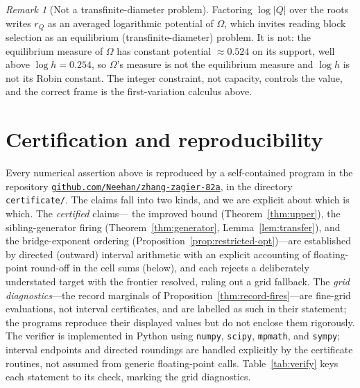 \documentclass[11pt,reqno]{amsart}
\theoremstyle{plain}
\theoremstyle{definition}
\theoremstyle{remark}
\newtheorem{remark}[theorem]{Remark}
\newcommand{\rQ}{r_Q}
\newcommand{\repo}{\href{https://github.com/Neehan/zhang-zagier-82a}{\texttt{github.com/Neehan/zhang-zagier-82a}}}
\begin{document}
\begin{remark}[Not a transfinite-diameter problem]\label{rem:noteq}
Factoring $\log|Q|$ over the roots writes $\rQ$ as an averaged logarithmic potential
of $\Omega$, which invites reading block selection as an equilibrium
(transfinite-diameter) problem. It is not: the equilibrium measure of $\Omega$ has
constant potential $\approx0.524$ on its support, well above $\log h=0.254$, so
$\Omega$'s measure is not the equilibrium measure and $\log h$ is not its Robin
constant. The integer constraint, not capacity, controls the value, and the correct
frame is the first-variation calculus above.
\end{remark}

\section{Certification and reproducibility}\label{sec:verify}

Every numerical assertion above is reproduced by a self-contained program in the
repository \repo, in the directory \texttt{certificate/}. The claims fall
into two kinds, and we are explicit about which is which. The \emph{certified} claims---
the improved bound (Theorem~\ref{thm:upper}), the sibling-generator firing
(Theorem~\ref{thm:generator}, Lemma~\ref{lem:transfer}), and the bridge-exponent ordering
(Proposition~\ref{prop:restricted-opt})---are established by directed (outward) interval
arithmetic with an explicit accounting of floating-point round-off in the cell sums
(below), and each rejects a deliberately understated target with the frontier resolved,
ruling out a grid fallback. The \emph{grid diagnostics}---the record marginals of
Proposition~\ref{thm:record-fires}---are fine-grid evaluations, not interval certificates,
and are labelled as such in their statement; the programs reproduce their displayed
values but do not enclose them rigorously. The verifier is implemented in Python using
\texttt{numpy}, \texttt{scipy}, \texttt{mpmath}, and \texttt{sympy}; interval endpoints
and directed roundings are handled explicitly by the certificate routines, not assumed
from generic floating-point calls. Table~\ref{tab:verify} keys each statement to its
check, marking the grid diagnostics.
\end{document}
